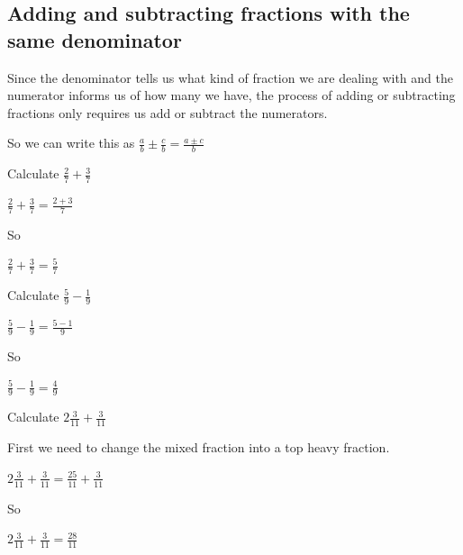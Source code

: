 \subsection{Adding and subtracting fractions with the same denominator}
Since the denominator tells us what kind of fraction we are dealing with and the numerator informs us of how many we have, the process of adding or subtracting fractions only requires us add or subtract the numerators.
\bigskip

\noindent So we can write this as $\displaystyle \frac{a}{b} \pm \frac{c}{b} = \frac{a \pm c}{b}$

\begin{exmp}
	Calculate $\displaystyle \frac{2}{7} + \frac{3}{7}$

	\bigskip

	$\displaystyle \frac{2}{7} + \frac{3}{7} = \frac{2 + 3}{7}$

	\bigskip

	So

	\bigskip

	$\displaystyle \frac{2}{7} + \frac{3}{7} = \frac{5}{7}$
\end{exmp}

\begin{exmp}
	Calculate $\displaystyle \frac{5}{9} - \frac{1}{9}$

	\bigskip

	$\displaystyle \frac{5}{9} - \frac{1}{9}= \frac{5 - 1}{9}$

	\bigskip

	So

	\bigskip

	$\displaystyle \frac{5}{9} - \frac{1}{9}= \frac{4}{9}$
\end{exmp}

\begin{exmp}
	Calculate $\displaystyle 2 \frac{3}{11} + \frac{3}{11}$

	\bigskip

	First we need to change the mixed fraction into a top heavy fraction.

	\bigskip

	$\displaystyle 2 \frac{3}{11} + \frac{3}{11} = \frac{25}{11} + \frac{3}{11}$

	\bigskip

	So

	\bigskip

	$\displaystyle 2 \frac{3}{11} + \frac{3}{11} = \frac{28}{11}$
\end{exmp}


